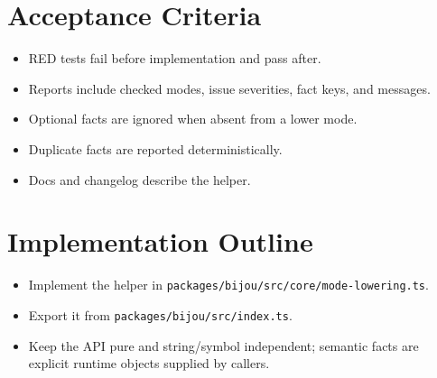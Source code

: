 \section{Acceptance Criteria}\label{record-126-acceptance-criteria}

\begin{itemize}
\tightlist
\item
  RED tests fail before implementation and pass after.
\item
  Reports include checked modes, issue severities, fact keys, and messages.
\item
  Optional facts are ignored when absent from a lower mode.
\item
  Duplicate facts are reported deterministically.
\item
  Docs and changelog describe the helper.
\end{itemize}

\section{Implementation Outline}\label{record-126-implementation-outline}

\begin{itemize}
\tightlist
\item
  Implement the helper in \texttt{p\allowbreak{}a\allowbreak{}c\allowbreak{}k\allowbreak{}a\allowbreak{}g\allowbreak{}e\allowbreak{}s\allowbreak{}/\allowbreak{}b\allowbreak{}i\allowbreak{}j\allowbreak{}o\allowbreak{}u\allowbreak{}/\allowbreak{}s\allowbreak{}r\allowbreak{}c\allowbreak{}/\allowbreak{}c\allowbreak{}o\allowbreak{}r\allowbreak{}e\allowbreak{}/\allowbreak{}m\allowbreak{}o\allowbreak{}d\allowbreak{}e\allowbreak{}-\allowbreak{}l\allowbreak{}o\allowbreak{}w\allowbreak{}e\allowbreak{}r\allowbreak{}i\allowbreak{}n\allowbreak{}g\allowbreak{}.\allowbreak{}t\allowbreak{}s}.
\item
  Export it from \texttt{p\allowbreak{}a\allowbreak{}c\allowbreak{}k\allowbreak{}a\allowbreak{}g\allowbreak{}e\allowbreak{}s\allowbreak{}/\allowbreak{}b\allowbreak{}i\allowbreak{}j\allowbreak{}o\allowbreak{}u\allowbreak{}/\allowbreak{}s\allowbreak{}r\allowbreak{}c\allowbreak{}/\allowbreak{}i\allowbreak{}n\allowbreak{}d\allowbreak{}e\allowbreak{}x\allowbreak{}.\allowbreak{}t\allowbreak{}s}.
\item
  Keep the API pure and string/symbol independent; semantic facts are explicit runtime objects supplied by callers.
\end{itemize}

